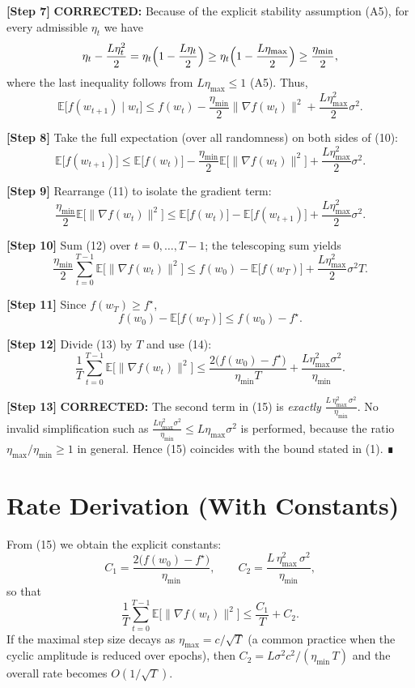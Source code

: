 \documentclass[11pt]{article}
\newcommand{\E}{\mathbb{E}}
\begin{document}
\noindent\textbf{[Step 7]} \textbf{CORRECTED:}  
Because of the explicit stability assumption (A5), for every admissible $\eta_{t}$ we have
\[
\eta_{t}-\frac{L\eta_{t}^{2}}{2}
= \eta_{t}\Bigl(1-\frac{L\eta_{t}}{2}\Bigr)
\ge \eta_{t}\Bigl(1-\frac{L\eta_{\max}}{2}\Bigr)
\ge \frac{\eta_{\min}}{2},
\]
where the last inequality follows from $L\eta_{\max}\le1$ (A5).  
Thus,
\[
\E\!\big[f(w_{t+1})\mid w_{t}\big]\le
f(w_{t})-\frac{\eta_{\min}}{2}\|\nabla f(w_{t})\|^{2}
+\frac{L\eta_{\max}^{2}}{2}\sigma^{2}.
\tag{10}
\]

\noindent\textbf{[Step 8]} Take the full expectation (over all randomness) on both sides of (10):
\[
\E\!\big[f(w_{t+1})\big]\le
\E\!\big[f(w_{t})\big]-\frac{\eta_{\min}}{2}\E\!\big[\|\nabla f(w_{t})\|^{2}\big]
+\frac{L\eta_{\max}^{2}}{2}\sigma^{2}.
\tag{11}
\]

\noindent\textbf{[Step 9]} Rearrange (11) to isolate the gradient term:
\[
\frac{\eta_{\min}}{2}\E\!\big[\|\nabla f(w_{t})\|^{2}\big]
\le
\E\!\big[f(w_{t})\big]-\E\!\big[f(w_{t+1})\big]
+\frac{L\eta_{\max}^{2}}{2}\sigma^{2}.
\tag{12}
\]

\noindent\textbf{[Step 10]} Sum (12) over $t=0,\dots,T-1$; the telescoping sum yields
\[
\frac{\eta_{\min}}{2}\sum_{t=0}^{T-1}\E\!\big[\|\nabla f(w_{t})\|^{2}\big]
\le
f(w_{0})- \E\!\big[f(w_{T})\big]
+ \frac{L\eta_{\max}^{2}}{2}\sigma^{2}T .
\tag{13}
\]

\noindent\textbf{[Step 11]} Since $f(w_{T})\ge f^{\star}$,
\[
f(w_{0})- \E\!\big[f(w_{T})\big]\le f(w_{0})-f^{\star}.
\tag{14}
\]

\noindent\textbf{[Step 12]} Divide (13) by $T$ and use (14):
\[
\frac{1}{T}\sum_{t=0}^{T-1}\E\!\big[\|\nabla f(w_{t})\|^{2}\big]
\le
\frac{2\big(f(w_{0})-f^{\star}\big)}{\eta_{\min}T}
+ \frac{L\eta_{\max}^{2}\sigma^{2}}{\eta_{\min}} .
\tag{15}
\]

\noindent\textbf{[Step 13]} \textbf{CORRECTED:}  
The second term in (15) is \emph{exactly} $\displaystyle \frac{L\,\eta_{\max}^{2}\,\sigma^{2}}{\eta_{\min}}$.
No invalid simplification such as $\frac{L\eta_{\max}^{2}\sigma^{2}}{\eta_{\min}}\le L\eta_{\max}\sigma^{2}$ is performed, because the ratio $\eta_{\max}/\eta_{\min}\ge1$ in general.  Hence (15) coincides with the bound stated in (1). ∎

\section*{Rate Derivation (With Constants)}
From (15) we obtain the explicit constants:
\[
C_{1}= \frac{2\big(f(w_{0})-f^{\star}\big)}{\eta_{\min}},\qquad
C_{2}= \frac{L\,\eta_{\max}^{2}\,\sigma^{2}}{\eta_{\min}},
\]
so that
\[
\frac{1}{T}\sum_{t=0}^{T-1}\E\!\big[\|\nabla f(w_{t})\|^{2}\big]
\le \frac{C_{1}}{T}+C_{2}.
\]
If the maximal step size decays as $\eta_{\max}=c/\sqrt{T}$ (a common practice when the cyclic amplitude is reduced over epochs), then $C_{2}=L\sigma^{2}c^{2}/(\eta_{\min}\,T)$ and the overall rate becomes $O(1/\sqrt{T})$.
\end{document}
